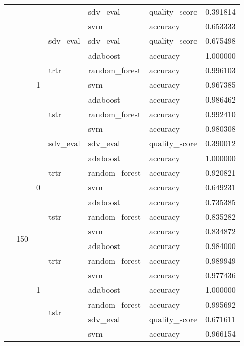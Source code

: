 \begin{longtable}{llllllr}
\cline{5-7}
 &  &  &  & sdv_eval & quality_score & 0.391814 \\
\cline{5-7}
 &  &  &  & svm & accuracy & 0.653333 \\
\cline{3-7} \cline{4-7} \cline{5-7}
 &  & \multirow[t]{7}{*}{1} & sdv_eval & sdv_eval & quality_score & 0.675498 \\
\cline{4-7} \cline{5-7}
 &  &  & \multirow[t]{3}{*}{trtr} & adaboost & accuracy & 1.000000 \\
\cline{5-7}
 &  &  &  & random_forest & accuracy & 0.996103 \\
\cline{5-7}
 &  &  &  & svm & accuracy & 0.967385 \\
\cline{4-7} \cline{5-7}
 &  &  & \multirow[t]{3}{*}{tstr} & adaboost & accuracy & 0.986462 \\
\cline{5-7}
 &  &  &  & random_forest & accuracy & 0.992410 \\
\cline{5-7}
 &  &  &  & svm & accuracy & 0.980308 \\
\cline{2-7} \cline{3-7} \cline{4-7} \cline{5-7}
 & \multirow[t]{14}{*}{150} & \multirow[t]{7}{*}{0} & sdv_eval & sdv_eval & quality_score & 0.390012 \\
\cline{4-7} \cline{5-7}
 &  &  & \multirow[t]{3}{*}{trtr} & adaboost & accuracy & 1.000000 \\
\cline{5-7}
 &  &  &  & random_forest & accuracy & 0.920821 \\
\cline{5-7}
 &  &  &  & svm & accuracy & 0.649231 \\
\cline{4-7} \cline{5-7}
 &  &  & \multirow[t]{3}{*}{tstr} & adaboost & accuracy & 0.735385 \\
\cline{5-7}
 &  &  &  & random_forest & accuracy & 0.835282 \\
\cline{5-7}
 &  &  &  & svm & accuracy & 0.834872 \\
\cline{3-7} \cline{4-7} \cline{5-7}
 &  & \multirow[t]{7}{*}{1} & \multirow[t]{3}{*}{trtr} & adaboost & accuracy & 0.984000 \\
\cline{5-7}
 &  &  &  & random_forest & accuracy & 0.989949 \\
\cline{5-7}
 &  &  &  & svm & accuracy & 0.977436 \\
\cline{4-7} \cline{5-7}
 &  &  & \multirow[t]{4}{*}{tstr} & adaboost & accuracy & 1.000000 \\
\cline{5-7}
 &  &  &  & random_forest & accuracy & 0.995692 \\
\cline{5-7}
 &  &  &  & sdv_eval & quality_score & 0.671611 \\
\cline{5-7}
 &  &  &  & svm & accuracy & 0.966154 \\
\cline{1-7} \cline{2-7} \cline{3-7} \cline{4-7} \cline{5-7}
\end{longtable}

